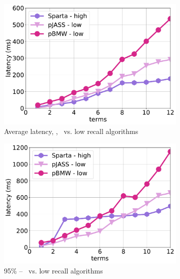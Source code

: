 {{\begin{figure}[tbh]
     \begin{subfigure}{0.325\textwidth}
         \includegraphics[width=\textwidth]{figures/latency_high_low_12threads_clueweb.pdf}
        \caption{Average latency, \cw, \alg\ vs. low recall algorithms}
        \label{fig:terms-scaling-low-avg}
      \end{subfigure}  
	\hfill
     	\begin{subfigure}{0.325\textwidth}
  	\includegraphics[width=\textwidth]{figures/latency_95th_percentile_high_low_clueweb.pdf}
  	\caption{95\%\bigdataset{, \cw} -- \alg\ vs. low recall algorithms}
	\label{fig:terms-scaling-low-95}
    \end{subfigure}
	\hfill    
      \begin{subfigure}{0.325\textwidth}

\end{subfigure}
\end{figure}}}
